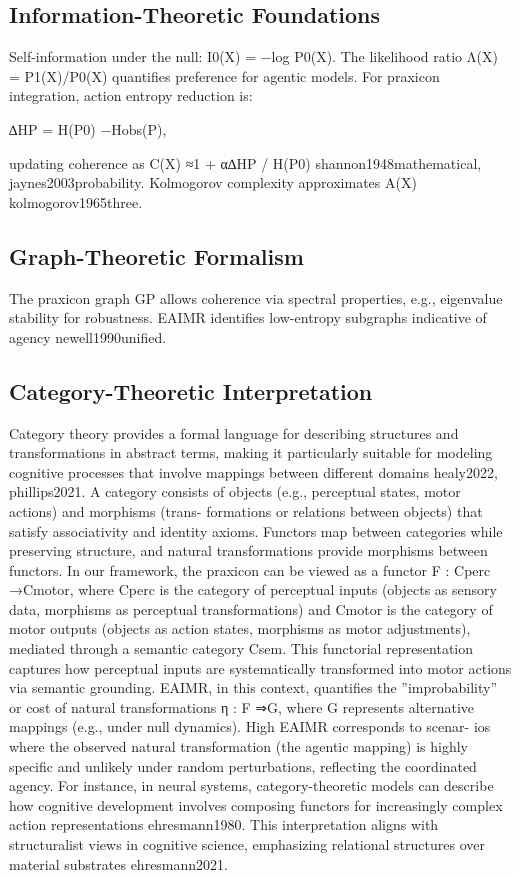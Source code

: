 \documentclass{article}
\begin{document}
\subsection{Information-Theoretic Foundations}
Self-information under the null: I0(X) = −log P0(X). The likelihood ratio Λ(X) = P1(X)/P0(X) quantifies
preference for agentic models. For praxicon integration, action entropy reduction is:

∆HP = H(P0) −Hobs(P),

updating coherence as C(X) ≈1 + α∆HP / H(P0) {shannon1948mathematical, jaynes2003probability}. Kolmogorov complexity approximates A(X)
{kolmogorov1965three}.

\subsection{Graph-Theoretic Formalism}
The praxicon graph GP allows coherence via spectral properties, e.g., eigenvalue stability for robustness.
EAIMR identifies low-entropy subgraphs indicative of agency {newell1990unified}.

\subsection{Category-Theoretic Interpretation}
Category theory provides a formal language for describing structures and transformations in abstract terms,
making it particularly suitable for modeling cognitive processes that involve mappings between different
domains {healy2022, phillips2021}. A category consists of objects (e.g., perceptual states, motor actions) and morphisms (trans-
formations or relations between objects) that satisfy associativity and identity axioms. Functors map between
categories while preserving structure, and natural transformations provide morphisms between functors.
In our framework, the praxicon can be viewed as a functor F : Cperc →Cmotor, where Cperc is the category
of perceptual inputs (objects as sensory data, morphisms as perceptual transformations) and Cmotor is the
category of motor outputs (objects as action states, morphisms as motor adjustments), mediated through
a semantic category Csem. This functorial representation captures how perceptual inputs are systematically
transformed into motor actions via semantic grounding.
EAIMR, in this context, quantifies the ”improbability” or cost of natural transformations η : F ⇒G,
where G represents alternative mappings (e.g., under null dynamics). High EAIMR corresponds to scenar-
ios where the observed natural transformation (the agentic mapping) is highly specific and unlikely under
random perturbations, reflecting the coordinated agency. For instance, in neural systems, category-theoretic
models can describe how cognitive development involves composing functors for increasingly complex action
representations {ehresmann1980}.
This interpretation aligns with structuralist views in cognitive science, emphasizing
relational structures over material substrates {ehresmann2021}.
\end{document}
